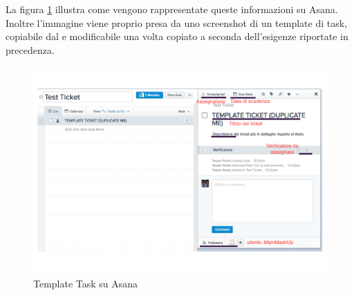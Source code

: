 			\noindent
			La figura \ref{fig:template_task_asana} illustra come vengono rappresentate queste informazioni su Asana. Inoltre l'immagine viene proprio presa da uno screenshot di un template di task, copiabile dal \roleProjectManager{} e modificabile una volta copiato a seconda dell'esigenze riportate in precedenza.
				\begin{figure}[htbp]
					\centering
					\includegraphics[width=14cm]{images/tpl_task_asana.pdf}
					\caption{Template Task su Asana}
					\label{fig:template_task_asana}
				\end{figure}
			
